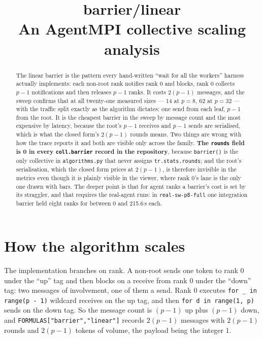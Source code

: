 \documentclass[11pt]{article}
\title{\textbf{barrier/linear}\\[2pt]\large An AgentMPI collective scaling analysis}
\author{}
\date{}
\begin{document}
\maketitle

\begin{abstract}
The linear barrier is the pattern every hand-written ``wait for all the workers'' harness
actually implements: each non-root rank notifies rank 0 and blocks, rank 0 collects $p-1$
notifications and then releases $p-1$ ranks. It costs $2(p-1)$ messages, and the sweep confirms
that at all twenty-one measured sizes --- 14 at $p=8$, 62 at $p=32$ --- with the traffic split
exactly as the algorithm dictates: one send from each leaf, $p-1$ from the root. It is the
cheapest barrier in the sweep by message count and the most expensive by latency, because the
root's $p-1$ receives and $p-1$ sends are serialised, which is what the closed form's $2(p-1)$
rounds means. Two things are wrong with how the trace reports it and both are visible only
across the family. \textbf{The \texttt{rounds} field is 0 in every \texttt{coll.barrier} record
in the repository}, because \texttt{barrier()} is the only collective in
\texttt{algorithms.py} that never assigns \texttt{tr.stats.rounds}; and the root's serialisation,
which the closed form prices at $2(p-1)$, is therefore invisible in the metrics even though it
is plainly visible in the viewer, where rank 0's lane is the only one drawn with bars. The
deeper point is that for agent ranks a barrier's cost is set by its straggler, and that
requires the real-agent runs: in \texttt{real-sw-p8-full} one integration barrier held eight
ranks for between 0 and 215.6\,s each.
\end{abstract}



\section{How the algorithm scales}

The implementation branches on rank. A non-root sends one token to rank 0 under the ``up'' tag
and then blocks on a receive from rank 0 under the ``down'' tag: two messages of involvement,
one of them a send. Rank 0 executes \texttt{for \_ in range(p - 1)} wildcard receives on the up
tag, and then \texttt{for d in range(1, p)} sends on the down tag. So the message count is
$(p-1)$ up plus $(p-1)$ down, and \texttt{FORMULAS["barrier","linear"]} records
$2(p-1)$ messages with $2(p-1)$ rounds and $2(p-1)$ tokens of volume, the payload being the
integer 1.
\end{document}
